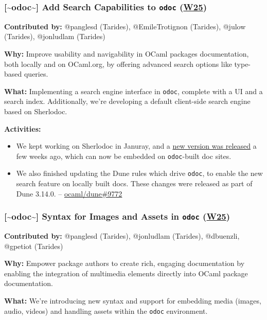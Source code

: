 \documentclass[11pt]{article}
\begin{document}
\subsubsection*{\textbf{{[}\textasciitilde{}odoc\textasciitilde{}]} Add Search Capabilities to \texttt{odoc} (\href{https://ocaml.org/docs/platform-roadmap\#w25-generate-documentation}{W25})}
\label{sec:org03e2b6f}

\textbf{Contributed by:} @panglesd (Tarides), @EmileTrotignon (Tarides), @julow (Tarides), @jonludlam (Tarides)

\textbf{Why:} Improve usability and navigability in OCaml packages documentation, both locally and on OCaml.org, by offering advanced
search options like type-based queries.

\textbf{What:} Implementing a search engine interface in \texttt{odoc}, complete with a UI and a search index. Additionally, we're developing a
default client-side search engine based on Sherlodoc.

\textbf{Activities:}
\begin{itemize}
\item We kept working on Sherlodoc in Januray, and a \href{https://discuss.ocaml.org/t/ann-sherlodoc-a-search-engine-for-ocaml-documentation/14011}{new version was released} a few weeks ago, which can now be embedded on \texttt{odoc}-built doc sites.
\item We also finished updating the Dune rules which drive \texttt{odoc}, to enable the new search feature on locally built docs. These changes were released as part of Dune 3.14.0. -- \href{https://github.com/ocaml/dune/pull/9772}{ocaml/dune\#9772}
\end{itemize}
\subsubsection*{\textbf{{[}\textasciitilde{}odoc\textasciitilde{}]} Syntax for Images and Assets in \texttt{odoc} (\href{https://ocaml.org/docs/platform-roadmap\#w25-generate-documentation}{W25})}
\label{sec:org982f96f}

\textbf{Contributed by:} @panglesd (Tarides), @jonludlam (Tarides), @dbuenzli, @gpetiot (Tarides)

\textbf{Why:} Empower package authors to create rich, engaging documentation by enabling the integration of multimedia elements directly
into OCaml package documentation.

\textbf{What:} We're introducing new syntax and support for embedding media (images, audio, videos) and handling assets within the \texttt{odoc}
environment.
\end{document}
